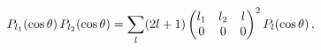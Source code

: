 \[\mathop{P_{l_{1}}\/}\nolimits\!\left(\mathop{\cos\/}\nolimits\theta\right)%
\mathop{P_{l_{2}}\/}\nolimits\!\left(\mathop{\cos\/}\nolimits\theta\right)=%
\sum_{l}(2l+1)\begin{pmatrix}l_{1}&l_{2}&l\\
0&0&0\end{pmatrix}^{2}\mathop{P_{l}\/}\nolimits\!\left(\mathop{\cos\/}%
\nolimits\theta\right),\]